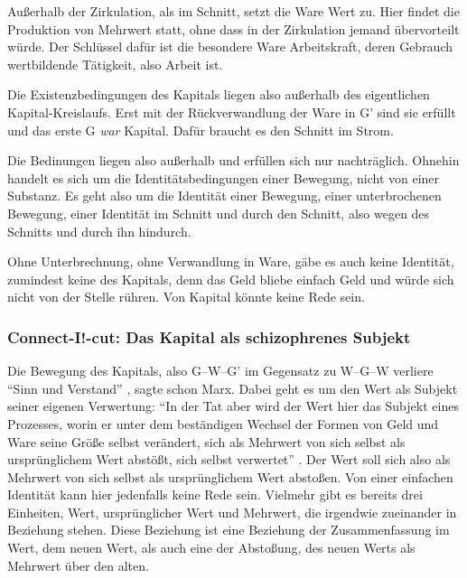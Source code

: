 \documentclass[12pt,
               DIV13,
               paper=a4,
               twoside=false,
               onehalfspacing,
               bibliography=totoc,
               toc=graduated,
               draft,
               ]{scrartcl}
\newcommand{\pc}[2]{\parencite[#1]{#2}}
\newcommand{\gwg}{G--W--G'\xspace}
\newcommand{\wgw}{W--G--W\xspace}
\begin{document}
Außerhalb der Zirkulation, als im Schnitt, setzt die Ware Wert zu.
Hier findet die Produktion von Mehrwert statt, ohne dass in der
Zirkulation jemand übervorteilt würde. Der Schlüssel dafür ist die
besondere Ware Arbeitskraft, deren Gebrauch wertbildende Tätigkeit,
also Arbeit ist.

Die Existenzbedingungen des Kapitals liegen also außerhalb des
eigentlichen Kapital-Kreislaufs. Erst mit der Rückverwandlung der Ware
in G' sind sie erfüllt und das erste G \emph{war} Kapital. Dafür
braucht es den Schnitt im Strom.

Die Bedinungen liegen also außerhalb und erfüllen sich nur
nachträglich. Ohnehin handelt es sich um die Identitätsbedingungen
einer Bewegung, nicht von einer Substanz. Es geht also um die
Identität einer Bewegung, einer unterbrochenen Bewegung, einer
Identität im Schnitt und durch den Schnitt, also wegen des Schnitts
und durch ihn hindurch.

Ohne Unterbrechnung, ohne Verwandlung in Ware, gäbe es auch keine
Identität, zumindest keine des Kapitals, denn das Geld bliebe einfach
Geld und würde sich nicht von der Stelle rühren. Von Kapital könnte
keine Rede sein.

\subsubsection{Connect-I!-cut: Das Kapital als schizophrenes Subjekt}

Die Bewegung des Kapitals, also \gwg im Gegensatz zu \wgw verliere
"`Sinn und Verstand"' \pc{166}{kap}, sagte schon Marx. Dabei geht es
um den Wert als Subjekt seiner eigenen Verwertung: "`In der Tat aber
wird der Wert hier das Subjekt eines Prozesses, worin er unter dem
beständigen Wechsel der Formen von Geld und Ware seine Größe selbst
verändert, sich als Mehrwert von sich selbst als ursprünglichem Wert
abstößt, sich selbst verwertet"' \pc{169}{kap}. Der Wert soll sich
also als Mehrwert von sich selbst als ursprünglichem Wert abstoßen.
Von einer einfachen Identität kann hier jedenfalls keine Rede sein.
Vielmehr gibt es bereits drei Einheiten, Wert, ursprünglicher Wert und
Mehrwert, die irgendwie zueinander in Beziehung stehen. Diese
Beziehung ist eine Beziehung der Zusammenfassung im Wert, dem neuen
Wert, als auch eine der Abstoßung, des neuen Werts als Mehrwert über
den alten.
\end{document}
